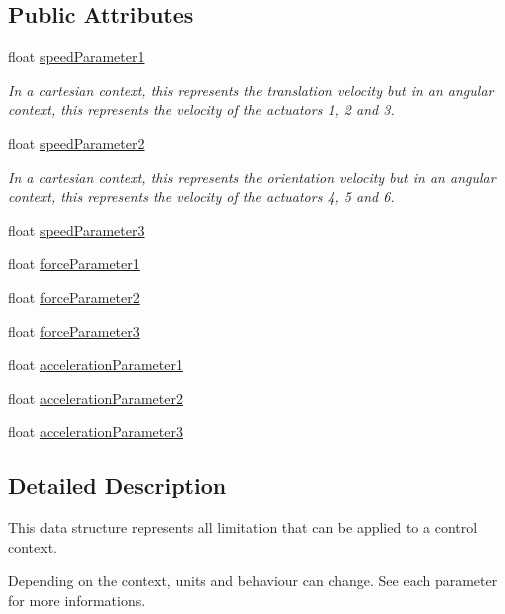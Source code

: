 \subsection*{Public Attributes}
\begin{DoxyCompactItemize}
\item 
float \hyperlink{struct_limitation_a3d36f2f90548acecb3e080d8c47d00f2}{speed\+Parameter1}
\begin{DoxyCompactList}\small\item\em In a cartesian context, this represents the translation velocity but in an angular context, this represents the velocity of the actuators 1, 2 and 3. \end{DoxyCompactList}\item 
float \hyperlink{struct_limitation_aa17c9688bba54c9a8e2208d38266ae93}{speed\+Parameter2}
\begin{DoxyCompactList}\small\item\em In a cartesian context, this represents the orientation velocity but in an angular context, this represents the velocity of the actuators 4, 5 and 6. \end{DoxyCompactList}\item 
float \hyperlink{struct_limitation_a3d2e542a721c712b06b70f554d10d468}{speed\+Parameter3}
\item 
float \hyperlink{struct_limitation_abafcff837c521cea6d410245547b148e}{force\+Parameter1}
\item 
float \hyperlink{struct_limitation_a4a48f99b82a0078cfedb029c92355bef}{force\+Parameter2}
\item 
float \hyperlink{struct_limitation_a25a3f8ac4759c63b46d2201b651817e5}{force\+Parameter3}
\item 
float \hyperlink{struct_limitation_a695b233ff2bd5f53460fcadad86c0cfa}{acceleration\+Parameter1}
\item 
float \hyperlink{struct_limitation_a1bc77d927cb14ce2f963ccfa53fb0d99}{acceleration\+Parameter2}
\item 
float \hyperlink{struct_limitation_a23cd4303674bd42a0e583fced50a3511}{acceleration\+Parameter3}
\end{DoxyCompactItemize}


\subsection{Detailed Description}
This data structure represents all limitation that can be applied to a control context. 

Depending on the context, units and behaviour can change. See each parameter for more informations. 

